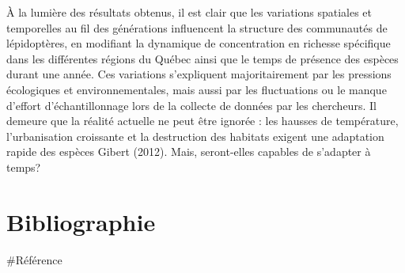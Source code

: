 \documentclass[9pt,twocolumn,twoside,]{pnas-new}
\begin{document}
À la lumière des résultats obtenus, il est clair que les variations
spatiales et temporelles au fil des générations influencent la structure
des communautés de lépidoptères, en modifiant la dynamique de
concentration en richesse spécifique dans les différentes régions du
Québec ainsi que le temps de présence des espèces durant une année. Ces
variations s'expliquent majoritairement par les pressions écologiques et
environnementales, mais aussi par les fluctuations ou le manque d'effort
d'échantillonnage lors de la collecte de données par les chercheurs. Il
demeure que la réalité actuelle ne peut être ignorée : les hausses de
température, l'urbanisation croissante et la destruction des habitats
exigent une adaptation rapide des espèces Gibert (2012). Mais,
seront-elles capables de s'adapter à temps?

\section*{Bibliographie}\label{bibliographie}

\#Référence
\end{document}
